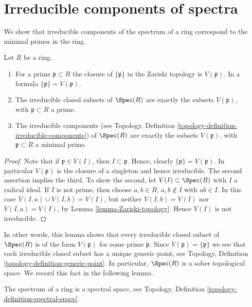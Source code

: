 \section{Irreducible components of spectra}
\label{section-irreducible}

\noindent
We show that irreducible components of
the spectrum of a ring correspond to the
minimal primes in the ring.

\begin{lemma}
\label{lemma-irreducible}
Let $R$ be a ring.
\begin{enumerate}
\item For a prime $\mathfrak p \subset R$ the closure
of $\{\mathfrak p\}$ in the Zariski topology is $V(\mathfrak p)$.
In a formula $\overline{\{\mathfrak p\}} = V(\mathfrak p)$.
\item The irreducible closed subsets of $\Spec(R)$ are
exactly the subsets $V(\mathfrak p)$, with $\mathfrak p \subset R$
a prime.
\item The irreducible components (see Topology,
Definition \ref{topology-definition-irreducible-components})
of $\Spec(R)$ are  exactly the subsets $V(\mathfrak p)$,
with $\mathfrak p \subset R$ a minimal prime.
\end{enumerate}
\end{lemma}

\begin{proof}
Note that if $ \mathfrak p \in V(I)$, then
$I \subset \mathfrak p$. Hence,
clearly $\overline{\{\mathfrak p\}} = V(\mathfrak p)$.
In particular $V(\mathfrak p)$ is the closure of
a singleton and hence irreducible.
The second assertion implies the third.
To show the second, let
$V(I) \subset \Spec(R)$ with $I$ a radical ideal.
If $I$ is not prime, then choose $a, b\in R$, $a, b\not \in I$
with $ab\in I$. In this case $V(I, a) \cup V(I, b) = V(I)$,
but neither $V(I, b) = V(I)$ nor $V(I, a) = V(I)$, by
Lemma \ref{lemma-Zariski-topology}. Hence $V(I)$ is not
irreducible.
\end{proof}

\noindent
In other words, this lemma shows that every irreducible closed
subset of $\Spec(R)$ is of the form $V(\mathfrak p)$ for
some prime $\mathfrak p$. Since $V(\mathfrak p) = \overline{\{\mathfrak p\}}$
we see that each irreducible closed subset has a unique generic point,
see Topology, Definition \ref{topology-definition-generic-point}.
In particular, $\Spec(R)$ is a sober topological space.
We record this fact in the following lemma.

\begin{lemma}
\label{lemma-spec-spectral}
The spectrum of a ring is a spectral space, see Topology, Definition
\ref{topology-definition-spectral-space}.
\end{lemma}

